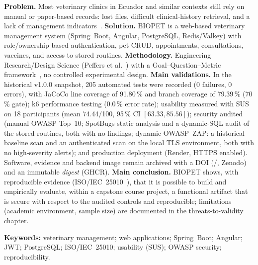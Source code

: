 \textbf{Problem.} Most veterinary clinics in Ecuador and similar contexts
still rely on manual or paper-based records: lost files, difficult
clinical-history retrieval, and a lack of management
indicators~\cite{cedeno2021veterinaria}. \textbf{Solution.} BIOPET is a
web-based veterinary management system (Spring~Boot, Angular,
PostgreSQL, Redis/Valkey) with role/ownership-based authentication, pet
CRUD, appointments, consultations, vaccines, and access to stored
routines. \textbf{Methodology.} Engineering Research/Design Science
(Peffers et al.~\cite{peffers2007dsrm}) with a Goal--Question--Metric
framework~\cite{vansolingen2002gqm}, no controlled experimental design.
\textbf{Main validations.} In the historical v1.0.0 snapshot, 205
automated tests were recorded (0 failures, 0 errors), with JaCoCo line
coverage of 91.80\,\% and branch coverage of 79.39\,\% (70\,\% gate); k6
performance testing (0.0\,\% error rate); usability measured
with SUS on 18 participants (mean 74.44/100, 95\,\% CI $[63.33, 85.56]$);
security audited (manual OWASP Top~10; SpotBugs static analysis and a
dynamic-SQL audit of the stored routines, both with no findings; dynamic
OWASP~ZAP: a historical baseline scan and an authenticated scan on the
local TLS environment, both with no high-severity alerts); and
production deployment (Render, HTTPS enabled). Software, evidence and
backend image remain archived with a DOI
(\texttt{\doisoftware}/\texttt{\doidataset}, Zenodo) and an immutable
\emph{digest} (GHCR). \textbf{Main conclusion.}
BIOPET shows, with reproducible evidence (ISO/IEC~25010~\cite{iso25010-2011}),
that it is possible to build and empirically evaluate, within a capstone
course project, a functional artifact that is secure with respect to the
audited controls and reproducible; limitations (academic environment,
sample size) are documented in the threats-to-validity chapter.

\textbf{Keywords:} veterinary management; web applications;
Spring~Boot; Angular; JWT; PostgreSQL; ISO/IEC~25010; usability (SUS);
OWASP security; reproducibility.

